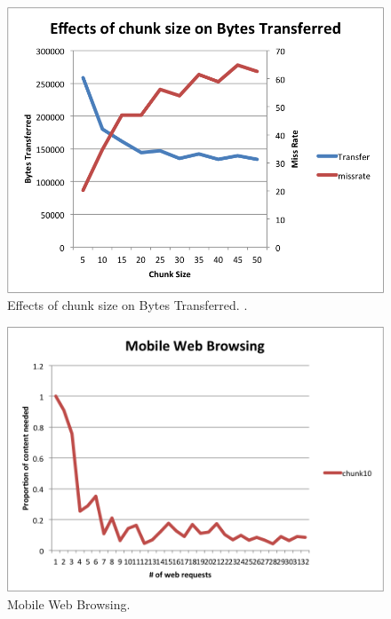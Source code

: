 \begin{figure}[h] 
\centering \includegraphics[width=\columnwidth]{images/chunksize2.png}
\caption{Effects of chunk size on Bytes Transferred. .}
\end{figure}

\begin{figure}[h] 
\centering \includegraphics[width=\columnwidth]{images/browsing.png}
\caption{Mobile Web Browsing. }
\end{figure}

